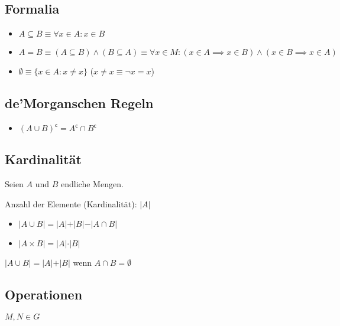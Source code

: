 \documentclass[12pt]{scrreprt}
\begin{document}
            \subsection{Formalia}
                \begin{itemize}
                    \item $ A \subseteq B \equiv \forall x \in A : x \in B $
                    \item $ A = B \equiv (A \subseteq B) \land (B \subseteq A) \equiv \forall x \in M : (x \in A \implies x \in B ) \land (x \in B \implies x \in A) $
                    \item $ \emptyset \equiv \{ x \in A : x \neq x \} $ ($ x \neq x \equiv \lnot x = x $)
                \end{itemize}


            \subsection{de'Morganschen Regeln}
                \begin{itemize}
                    \item $ (A \cup B) ^ \mathsf{c} = A ^ \mathsf{c} \cap B ^ \mathsf{c} $
                \end{itemize}


            \subsection{Kardinalität}
                Seien $ A $ und $ B $ endliche Mengen.

                Anzahl der Elemente (Kardinalität): $ \vert A \vert $

                \begin{itemize}
                    \item $ \vert A \cup B \vert = \vert A \vert + \vert B \vert - \vert A \cap B \vert $
                    \item $ \vert A \times B \vert = \vert A \vert \cdot \vert B \vert $
                \end{itemize}

                $ \vert A \cup B \vert = \vert A \vert + \vert B \vert $ wenn $ A \cap B = \emptyset $


            \subsection{Operationen}
                $ M, N \in G $
\end{document}
